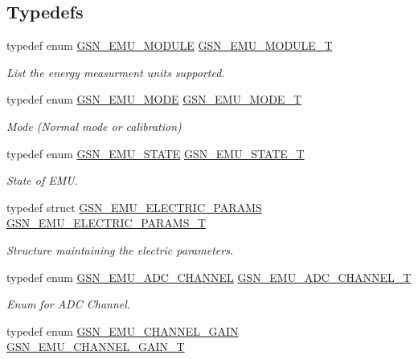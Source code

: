 \subsection*{Typedefs}
\begin{DoxyCompactItemize}
\item 
typedef enum \hyperlink{a00663_ga2347334b7caf4141497a9455bf724391}{GSN\_\-EMU\_\-MODULE} \hyperlink{a00663_ga080611b90847f38e9ac1972093fdef77}{GSN\_\-EMU\_\-MODULE\_\-T}
\begin{DoxyCompactList}\small\item\em List the energy measurment units supported. \end{DoxyCompactList}\item 
typedef enum \hyperlink{a00663_ga0643cb0399fc9877fcce3cccd4672fe2}{GSN\_\-EMU\_\-MODE} \hyperlink{a00663_gafbaa4d30aa4b736f3465344d6a5935b0}{GSN\_\-EMU\_\-MODE\_\-T}
\begin{DoxyCompactList}\small\item\em Mode (Normal mode or calibration) \end{DoxyCompactList}\item 
typedef enum \hyperlink{a00663_gaea130dfd5920349319a192bd421ec2be}{GSN\_\-EMU\_\-STATE} \hyperlink{a00663_gab09444b3018b5461230d789c746b56a0}{GSN\_\-EMU\_\-STATE\_\-T}
\begin{DoxyCompactList}\small\item\em State of EMU. \end{DoxyCompactList}\item 
typedef struct \hyperlink{a00060}{GSN\_\-EMU\_\-ELECTRIC\_\-PARAMS} \hyperlink{a00663_ga0a914f818f80d855cbc6a5ccd57ca239}{GSN\_\-EMU\_\-ELECTRIC\_\-PARAMS\_\-T}
\begin{DoxyCompactList}\small\item\em Structure maintaining the electric parameters. \end{DoxyCompactList}\item 
typedef enum \hyperlink{a00663_gaeae2554ac24a2af2730f23c80adf08bf}{GSN\_\-EMU\_\-ADC\_\-CHANNEL} \hyperlink{a00663_gaa251b8ce4165f71014388dea20af4369}{GSN\_\-EMU\_\-ADC\_\-CHANNEL\_\-T}
\begin{DoxyCompactList}\small\item\em Enum for ADC Channel. \end{DoxyCompactList}\item 
typedef enum \hyperlink{a00663_ga8a2c32cf9a6a1b827e675b91b42eab47}{GSN\_\-EMU\_\-CHANNEL\_\-GAIN} \hyperlink{a00663_ga28c8e45a08f0c7cfb9b129f54d3d3dcc}{GSN\_\-EMU\_\-CHANNEL\_\-GAIN\_\-T}

\end{DoxyCompactItemize}
